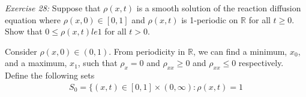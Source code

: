 \documentclass{article}
\newcommand{\exercise}[2]{
\vspace{0.2in}\begin{mdframed}[
  backgroundcolor=problem,
  skipabove=\topsep,
  skipbelow=\topsep
  ]
  \emph{Exercise {#1}:} {#2}
\end{mdframed}}
\newcommand{\R}{\mathbb{R}}
\begin{document}
      \exercise{28}{Suppose that $\rho(x,t)$ is a smooth solution of the reaction diffusion equation where $\rho(x,0)\in [0,1]$ and $\rho(x,t)$ is 1-periodic on $\R$ for all $t\ge 0$. Show that $0\le \rho(x,t) le 1$ for all $t > 0$.}
      Consider $\rho(x,0) \in (0,1)$. From periodicity in $\R$, we can find a minimum, $x_0$, and a maximum, $x_1$, such that $\rho_x = 0$ and $\rho_{xx} \ge 0$ and $\rho_{xx} \le 0$ respectively.\newline
      Define the following sets
      \begin{align*}
        S_0 = \{(x,t) \in [0,1]\times (0,\infty): \rho(x,t) = 1
      \end{align*}
    
\end{document}
